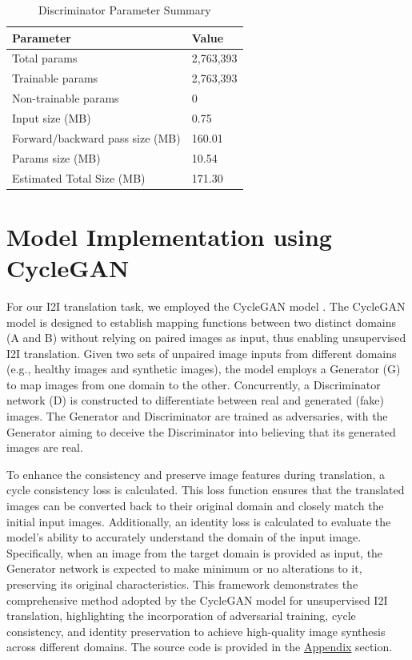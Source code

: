 \documentclass[UKenglish,12pt]{master-style}
\begin{document}
\begin{table}[h]
    \centering
    \caption{Discriminator Parameter Summary}
    \label{tab:Discriminator_Hyperparameter}
    \begin{tabular}{|l|l|}
    \hline
    \textbf{Parameter} & \textbf{Value} \\ 
    \hline
    Total params & 2,763,393 \\ 
    \hline
    Trainable params & 2,763,393 \\ 
    \hline
    Non-trainable params & 0 \\ 
    \hline
    Input size (MB) & 0.75 \\ 
    \hline
    Forward/backward pass size (MB) & 160.01 \\ 
    \hline
    Params size (MB) & 10.54 \\ 
    \hline
    Estimated Total Size (MB) & 171.30 \\ 
    \hline
    \end{tabular}
\end{table}



\section{Model Implementation using CycleGAN}

For our I2I translation task, we employed the CycleGAN model \cite{CycleGAN}. The CycleGAN model is designed to establish mapping functions between two distinct domains (A and B) without relying on paired images as input, thus enabling unsupervised I2I translation. Given two sets of unpaired image inputs from different domains (e.g., healthy images and synthetic images), the model employs a Generator (G) to map images from one domain to the other. Concurrently, a Discriminator network (D) is constructed to differentiate between real and generated (fake) images. The Generator and Discriminator are trained as adversaries, with the Generator aiming to deceive the Discriminator into believing that its generated images are real.

To enhance the consistency and preserve image features during translation, a cycle consistency loss is calculated. This loss function \cite{CycleGAN} ensures that the translated images can be converted back to their original domain and closely match the initial input images. Additionally, an identity loss is calculated to evaluate the model's ability to accurately understand the domain of the input image. Specifically, when an image from the target domain is provided as input, the Generator network is expected to make minimum or no alterations to it, preserving its original characteristics. This framework demonstrates the comprehensive method adopted by the CycleGAN model for unsupervised I2I translation, highlighting the incorporation of adversarial training, cycle consistency, and identity preservation to achieve high-quality image synthesis across different domains. The source code is provided in the \hyperref[appendix]{Appendix} section. 
\end{document}
